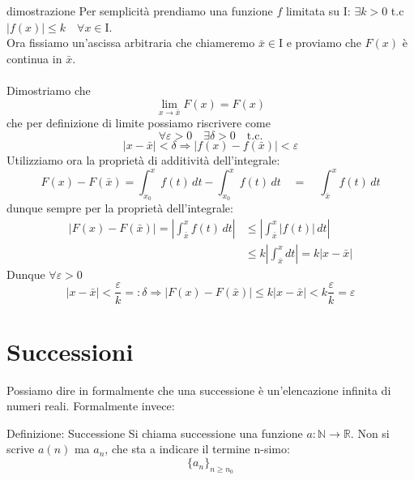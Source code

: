 \documentclass[x11names]{article}
\begin{document}
	\begin{es}{dimostrazione}
		Per semplicità prendiamo una funzione $f$ limitata su I: $\exists k >0$ t.c $|f(x)| \leq k \quad \forall x \in \text{I}$.\\
		Ora fissiamo un'ascissa arbitraria che chiameremo $\bar{x} \in \text{I}$ e proviamo che $F(x)$ è continua in $\bar{x}$. \\ \\
		
		Dimostriamo che 
		\[
		\lim_{x \to \bar{x}}F(x) = F(x)
		\]
		che per definizione di limite possiamo riscrivere come
		\[
		\forall\varepsilon > 0 \quad \exists \delta > 0 \quad \text{t.c.} 
		\]
		\[
		|x-\bar{x}| < \delta \Longrightarrow |f(x) - f(\bar{x})| < \varepsilon
		\]
		Utilizziamo ora la proprietà di additività dell'integrale:
		\[
		F(x) - F(\bar{x}) = \int_{x_0}^{x}f(t) \,dt - \int_{x_0}^{x}f(t) \,dt  \quad = \quad \int_{\bar{x}}^{x}f(t) \,dt
		\]
		dunque sempre per la proprietà dell'integrale:
		\begin{align*}
			|F(x) - F(\bar{x})| = \left|\int_{\bar{x}}^{x}f(t) \,dt\right| &\leq \left|\int_{\bar{x}}^{x}|f(t)| \,dt\right| \\
			&\leq k\left|\int_{\bar{x}}^{x}dt\right| = k |x - \bar{x}|
		\end{align*}
		Dunque $\forall \varepsilon > 0$
		\[
		|x-\bar{x}| < \frac{\varepsilon}{k} =: \delta \Longrightarrow |F(x) - F(\bar{x})| \leq k|x-\bar{x}| < k \frac{\varepsilon}{k} = \varepsilon
		\]
		
	\end{es}
	
	\newpage
	\section{Successioni}
	Possiamo dire in formalmente che una successione è un'elencazione infinita di numeri reali. Formalmente invece:
		\begin{center}
		\colorbox{myblue}{\begin{minipage}{5.75in}
				\begin{blues}{Definizione: Successione}
					Si chiama successione una funzione $a: \mathbb{N}\to \mathbb{R}$. Non si scrive $a(n)$ ma $a_n$, che sta a indicare il termine n-simo:
					\[
					\{a_n\}_{n\geq n_0}
					\]
				\end{blues}
		\end{minipage}}       
	\end{center}
	
\end{document}
